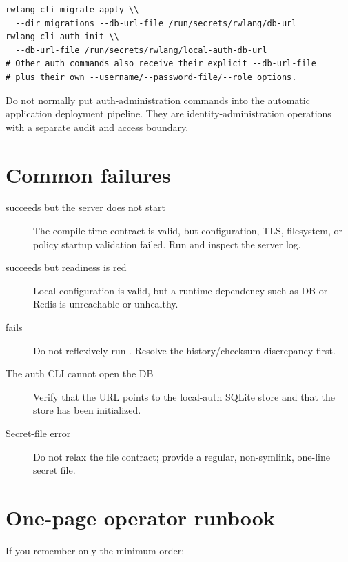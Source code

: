 \begin{lstlisting}
rwlang-cli migrate apply \\
  --dir migrations --db-url-file /run/secrets/rwlang/db-url
rwlang-cli auth init \\
  --db-url-file /run/secrets/rwlang/local-auth-db-url
# Other auth commands also receive their explicit --db-url-file
# plus their own --username/--password-file/--role options.
\end{lstlisting}

Do not normally put auth-administration commands into the automatic application deployment pipeline. They are identity-administration operations with a separate audit and access boundary.

\section{Common failures}

\begin{description}
  \item[ succeeds but the server does not start] The compile-time contract is valid, but configuration, TLS, filesystem, or policy startup validation failed. Run  and inspect the server log.
  \item[ succeeds but readiness is red] Local configuration is valid, but a runtime dependency such as DB or Redis is unreachable or unhealthy.
  \item[ fails] Do not reflexively run . Resolve the history/checksum discrepancy first.
  \item[The auth CLI cannot open the DB] Verify that the URL points to the local-auth SQLite store and that the store has been initialized.
  \item[Secret-file error] Do not relax the file contract; provide a regular, non-symlink, one-line secret file.
\end{description}

\section{One-page operator runbook}

If you remember only the minimum order:

